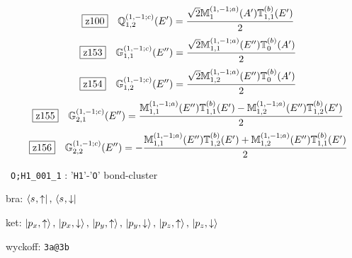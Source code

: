 \documentclass[fleqn,10pt,landscape]{jsarticle}
\begin{document}
\begin{dmath*}
\hspace*{3mm}\fbox{z100}\quad \mathbb{Q}_{1,2}^{(1,-1;c)}(E^{\prime})=\frac{\sqrt{2} \mathbb{M}_{1}^{(1,-1;a)}(A^{\prime}) \mathbb{T}_{1,1}^{(b)}(E^{\prime})}{2}
\end{dmath*}
\begin{dmath*}
\hspace*{3mm}\fbox{z153}\quad \mathbb{G}_{1,1}^{(1,-1;c)}(E^{\prime\prime})=\frac{\sqrt{2} \mathbb{M}_{1,1}^{(1,-1;a)}(E^{\prime\prime}) \mathbb{T}_{0}^{(b)}(A^{\prime})}{2}
\end{dmath*}
\begin{dmath*}
\hspace*{3mm}\fbox{z154}\quad \mathbb{G}_{1,2}^{(1,-1;c)}(E^{\prime\prime})=\frac{\sqrt{2} \mathbb{M}_{1,2}^{(1,-1;a)}(E^{\prime\prime}) \mathbb{T}_{0}^{(b)}(A^{\prime})}{2}
\end{dmath*}
\begin{dmath*}
\hspace*{3mm}\fbox{z155}\quad \mathbb{G}_{2,1}^{(1,-1;c)}(E^{\prime\prime})=\frac{\mathbb{M}_{1,1}^{(1,-1;a)}(E^{\prime\prime}) \mathbb{T}_{1,1}^{(b)}(E^{\prime}) - \mathbb{M}_{1,2}^{(1,-1;a)}(E^{\prime\prime}) \mathbb{T}_{1,2}^{(b)}(E^{\prime})}{2}
\end{dmath*}
\begin{dmath*}
\hspace*{3mm}\fbox{z156}\quad \mathbb{G}_{2,2}^{(1,-1;c)}(E^{\prime\prime})=- \frac{\mathbb{M}_{1,1}^{(1,-1;a)}(E^{\prime\prime}) \mathbb{T}_{1,2}^{(b)}(E^{\prime}) + \mathbb{M}_{1,2}^{(1,-1;a)}(E^{\prime\prime}) \mathbb{T}_{1,1}^{(b)}(E^{\prime})}{2}
\end{dmath*}
\vspace{5mm}

\noindent\textbullet\, \texttt{O;H1_001_1} : '\texttt{H1}'-'\texttt{O}' bond-cluster

\noindent\quad * bra: $\bra{s_{},\uparrow},\, \bra{s_{},\downarrow}$

\noindent\quad * ket: $\ket{p_{x},\uparrow},\, \ket{p_{x},\downarrow},\, \ket{p_{y},\uparrow},\, \ket{p_{y},\downarrow},\, \ket{p_{z},\uparrow},\, \ket{p_{z},\downarrow}$

\noindent\quad * wyckoff: \texttt{3a@3b}
\end{document}
